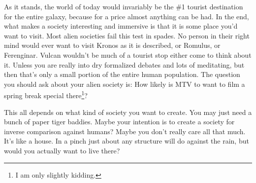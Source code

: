 As it stands, the world of today would invariably be the \#1 tourist destination for the entire galaxy, because for a price almost anything can be had. In the end, what makes a society interesting and immersive is that it is some place you'd want to visit. Most alien societies fail this test in spades. No person in their right mind would ever want to visit Kronos as it is described, or Romulus, or Ferenginar. Vulcan wouldn't be much of a tourist stop either come to think about it. Unless you are really into dry formalized debates and lots of meditating, but then that's only a small portion of the entire human population. The question you should ask about your alien society is: How likely is MTV to want to film a spring break special there\footnote{I am only slightly kidding.}?

This all depends on what kind of society you want to create. You may just need a bunch of paper tiger baddies. Maybe your intention is to create a society for inverse comparison against humans? Maybe you don't really care all that much. It's like a house. In a pinch just about any structure will do against the rain, but would you actually want to live there? 





